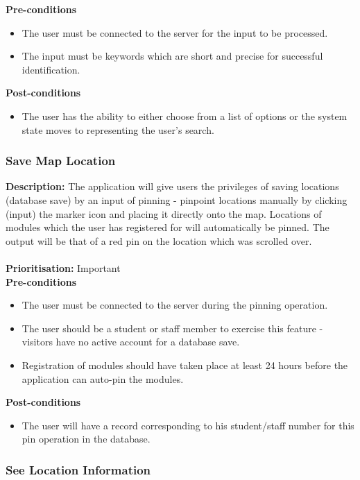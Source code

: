 \documentclass[runningheads,a4paper]{article}
\begin{document}
  
\textbf{Pre-conditions}
\begin{itemize}
 	\item The user must be connected to the server for the input to be processed.
	\item The input must be keywords which are short and precise for successful identification.
\end{itemize}
  
\textbf{Post-conditions}
\begin{itemize}
  	\item The user has the ability to either choose from a list of options or the system state moves to representing the user's search.
\end{itemize}

\subsubsection{Save Map Location}

\textbf{Description:}  The application will give users the privileges of saving locations (database save) by an input of pinning - pinpoint locations manually by clicking (input) the marker icon and placing it directly onto the map. Locations of modules which the user has registered for will automatically be pinned. The output will be that of a red pin on the location which was scrolled over.\\\\
\noindent
\textbf{Prioritisation:} Important\\
  
  
\textbf{Pre-conditions}
\begin{itemize}
 	\item The user must be connected to the server during the pinning operation.
	\item The user should be a student or staff member to exercise this feature - visitors have no active account for a database save.
	\item Registration of modules should have taken place at least 24 hours before the application can auto-pin the modules.
\end{itemize}
  
\textbf{Post-conditions}
\begin{itemize}
  	\item The user will have a record corresponding to his student/staff number for this pin operation in the database.
\end{itemize}

\subsubsection{See Location Information}
\end{document}
